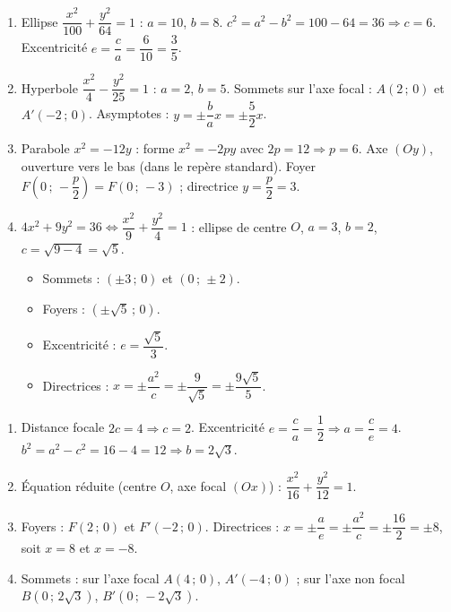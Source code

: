\documentclass[11pt]{article}
\begin{document}
\begin{corrige}
\begin{enumerate}
\item Ellipse $\dfrac{x^{2}}{100} + \dfrac{y^{2}}{64} = 1$ : $a=10$, $b=8$. $c^{2} = a^{2} - b^{2} = 100 - 64 = 36 \Rightarrow c = 6$. Excentricité $e = \dfrac{c}{a} = \dfrac{6}{10} = \dfrac{3}{5}$.
\item Hyperbole $\dfrac{x^{2}}{4} - \dfrac{y^{2}}{25} = 1$ : $a=2$, $b=5$. Sommets sur l'axe focal : $A(2\,;\,0)$ et $A'(-2\,;\,0)$. Asymptotes : $y = \pm \dfrac{b}{a}x = \pm \dfrac{5}{2}x$.
\item Parabole $x^{2} = -12y$ : forme $x^{2} = -2py$ avec $2p = 12 \Rightarrow p = 6$. Axe $(Oy)$, ouverture vers le bas (dans le repère standard). Foyer $F\left(0\,;\,-\dfrac{p}{2}\right) = F(0\,;\,-3)$ ; directrice $y = \dfrac{p}{2} = 3$.
\item $4x^{2} + 9y^{2} = 36 \iff \dfrac{x^{2}}{9} + \dfrac{y^{2}}{4} = 1$ : ellipse de centre $O$, $a=3$, $b=2$, $c = \sqrt{9-4} = \sqrt{5}$.
  \begin{itemize}
    \item Sommets : $(\pm 3\,;\,0)$ et $(0\,;\,\pm 2)$.
    \item Foyers : $(\pm\sqrt{5}\,;\,0)$.
    \item Excentricité : $e = \dfrac{\sqrt{5}}{3}$.
    \item Directrices : $x = \pm \dfrac{a^{2}}{c} = \pm \dfrac{9}{\sqrt{5}} = \pm \dfrac{9\sqrt{5}}{5}$.
  \end{itemize}
\end{enumerate}
\end{corrige}

\begin{corrige}
\begin{enumerate}
\item Distance focale $2c = 4 \Rightarrow c = 2$. Excentricité $e = \dfrac{c}{a} = \dfrac{1}{2} \Rightarrow a = \dfrac{c}{e} = 4$. $b^{2} = a^{2} - c^{2} = 16 - 4 = 12 \Rightarrow b = 2\sqrt{3}$.
\item Équation réduite (centre $O$, axe focal $(Ox)$) : $\dfrac{x^{2}}{16} + \dfrac{y^{2}}{12} = 1$.
\item Foyers : $F(2\,;\,0)$ et $F'(-2\,;\,0)$. Directrices : $x = \pm \dfrac{a}{e} = \pm \dfrac{a^{2}}{c} = \pm \dfrac{16}{2} = \pm 8$, soit $x = 8$ et $x = -8$.
\item Sommets : sur l'axe focal $A(4\,;\,0)$, $A'(-4\,;\,0)$ ; sur l'axe non focal $B(0\,;\,2\sqrt{3})$, $B'(0\,;\,-2\sqrt{3})$.
\end{enumerate}
\end{corrige}
\end{document}

